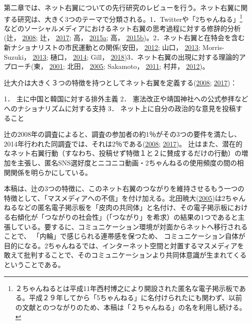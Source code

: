 \documentclass[10pt,british,A4paper,twoside]{memoir}
\begin{document}
第二章では、ネット右翼についての先行研究のレビューを行う。ネット右翼に関する研究は、大きく3つのテーマで分類される。1．Twitterや「2ちゃんねる」\footnote{２ちゃんねるとは平成11年西村博之により開設された匿名な電子掲示板である。平成２９年してから「5ちゃんねる」に名付けられたにも関わず、以前の文献とのつながりのため、本稿は「２ちゃんねる」の名を利用し続ける。}などのソーシャルメディアにおけるネット右翼の思考過程に対する修辞的分析(辻，
\protect\hyperlink{ref-tsuji_eng:_2008}{2008}; 辻，
\protect\hyperlink{ref-tsuji_eng._2017}{2017}; 高，
\protect\hyperlink{ref-taka_twitter_2015}{2015}\protect\hyperlink{ref-taka_twitter_2015}{a};
高，
\protect\hyperlink{ref-taka_twitter_2015-1}{2015}\protect\hyperlink{ref-taka_twitter_2015-1}{b})。2．ネット右翼と在特会を含む新ナショナリストの市民運動との関係(安田，
\protect\hyperlink{ref-yasuda_eng:_2012}{2012}; 山口，
\protect\hyperlink{ref-yamaguchi_xenophobia_2013}{2013}; Morris-Suzuki，
\protect\hyperlink{ref-morris-suzuki_freedom_2013}{2013}; 樋口，
\protect\hyperlink{ref-higuchi_japans_2014}{2014}; Gill，
\protect\hyperlink{ref-gill_nativist_2018}{2018})3．ネット右翼の出現に対する理論的アプローチ(東，
\protect\hyperlink{ref-azuma_otaku:_2001}{2001}; 北田，
\protect\hyperlink{ref-kitada_eng:_2005}{2005}; Sakamoto，
\protect\hyperlink{ref-sakamoto_koreans_2011}{2011}; 村井，
\protect\hyperlink{ref-murai_net_2012}{2012})。

辻大介は大きく３つの特徴を持つとしてネット右翼を定義する(\protect\hyperlink{ref-tsuji_eng:_2008}{2008};
\protect\hyperlink{ref-tsuji_eng._2017}{2017})：

1． 主に中国と韓国に対する排外主義 2．
憲法改正や靖国神社への公式参拝などへのナショナリズムに対する支持 3．
ネット上に自分の政治的な意見を投稿すること

辻の2008年の調査によると、調査の参加者の約1％がその3つの要件を満たし、2014年行われた同調査では、それは2％である(\protect\hyperlink{ref-tsuji_eng:_2008}{2008};
\protect\hyperlink{ref-tsuji_eng._2017}{2017})。
辻はまた、潜在的なネット右翼行動（すなわち、投稿せず特徴１と２に賛成するだけの行動）の増加を主張し、匿名SNS選好度とニコニコ動画・2ちゃんねるの使用頻度の間の相関関係を明らかにしている。

本稿は、辻の3つの特徴に、このネット右翼のつながりを維持させるもう一つの特徴として、「マスメディアへの不信」を付け加える。北田暁大(\protect\hyperlink{ref-kitada_eng:_2005}{2005})は2ちゃんねるなどの匿名電子掲示板を「皮肉の共同体」と名付け、その電子掲示板における右傾化が「つながりの社会性」（「つながり」を希求）の結果の1つであると主張している。要するに、コミュニケーション環境が対面からネットへ移行されることで、
「内輪」で感じられる連帯感を保つため、
コミュニケーション自体が目的になる。2ちゃんねるでは、インターネット空間と対置するマスメディアを敢えて批判することで、そのコミュニケーションより共同体意識が生まれてくるということである。
\end{document}
